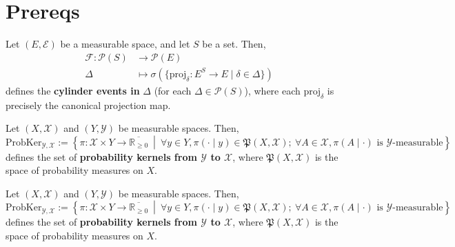 \chapter{Prereqs}

\begin{definition}
    \label{def:cylinder-event}
    \leanok
    Let $(E,\mathcal{E})$ be a measurable space, and let $S$ be a set. Then,
    \begin{align*}
        \mathcal{F}:\mathcal{P}(S)&\to\mathcal{P}(E)\\
        \Delta&\mapsto \sigma(\{\text{proj}_\delta:E^S\to E\mid \delta\in \Delta\})
    \end{align*}
    defines the \textbf{cylinder events in }$\Delta$ (for each $\Delta\in\mathcal{P}(S)$), where each $\text{proj}_\delta$ is precisely the canonical projection map.
\end{definition}

\begin{definition}[Kernel]
    \label{def:kernel}
    \leanok
    Let $(X,\mathcal{X})$ and $(Y,\mathcal{Y})$ be measurable spaces. Then,
    \begin{equation*}
        \text{ProbKer}_{\mathcal{Y},\mathcal{X}}:=\left\{\pi:\mathcal{X}\times Y\to\overline{\mathbb{R}_{\geq0}}~\middle\vert~ \forall y\in Y,\pi(\cdot\mid y)\in\mathfrak{P}(X,\mathcal{X});~\forall A\in\mathcal{X},\pi(A\mid\cdot)\text{ is }\mathcal{Y}\text{-measurable}\right\}
    \end{equation*}
    defines the set of \textbf{probability kernels from $\mathcal{Y}$ to $\mathcal{X}$}, where $\mathfrak{P}(X,\mathcal{X})$ is the space of probability measures on $X$.
\end{definition}

\begin{definition}
    \label{def:proper-kernel}
    \leanok
    Let $(X,\mathcal{X})$ and $(Y,\mathcal{Y})$ be measurable spaces. Then,
    \begin{equation*}
        \text{ProbKer}_{\mathcal{Y},\mathcal{X}}:=\left\{\pi:\mathcal{X}\times Y\to\overline{\mathbb{R}_{\geq0}}~\middle\vert~ \forall y\in Y,\pi(\cdot\mid y)\in\mathfrak{P}(X,\mathcal{X});~\forall A\in\mathcal{X},\pi(A\mid\cdot)\text{ is }\mathcal{Y}\text{-measurable}\right\}
    \end{equation*}
    defines the set of \textbf{probability kernels from $\mathcal{Y}$ to $\mathcal{X}$}, where $\mathfrak{P}(X,\mathcal{X})$ is the space of probability measures on $X$.
\end{definition}

